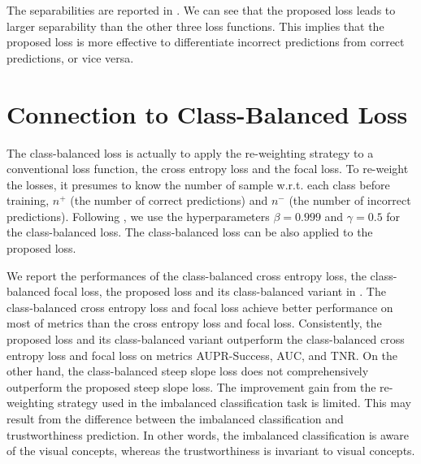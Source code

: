 

The separabilities are reported in . We can see that the proposed loss leads to larger separability than the other three loss functions. This implies that the proposed loss is more effective to differentiate incorrect predictions from correct predictions, or vice versa.

\section{Connection to Class-Balanced Loss}
\label{sec:cbloss}

The class-balanced loss \cite{Cui_CVPR_2019} is actually to apply the re-weighting strategy to a conventional loss function, \eg the cross entropy loss and the focal loss.
To re-weight the losses, it presumes to know the number of sample w.r.t. each class before training, \ie $n^{+}$ (the number of correct predictions) and $n^{-}$ (the number of incorrect predictions).
Following \cite{Cui_CVPR_2019}, we use the hyperparameters $\beta=0.999$ and $\gamma=0.5$ for the class-balanced loss.
The class-balanced loss can be also applied to the proposed loss.

We report the performances of the class-balanced cross entropy loss, the class-balanced focal loss, the proposed loss and its class-balanced variant in .
The class-balanced cross entropy loss and focal loss achieve better performance on most of metrics than the cross entropy loss and focal loss.
Consistently, the proposed loss and its class-balanced variant outperform the class-balanced cross entropy loss and focal loss on metrics AUPR-Success, AUC, and TNR.
On the other hand, the class-balanced steep slope loss does not comprehensively outperform the proposed steep slope loss.
The improvement gain from the re-weighting strategy used in the imbalanced classification task is limited. This may result from the difference between the imbalanced classification and trustworthiness prediction. In other words, the imbalanced classification is aware of the visual concepts, whereas the trustworthiness is invariant to visual concepts.





